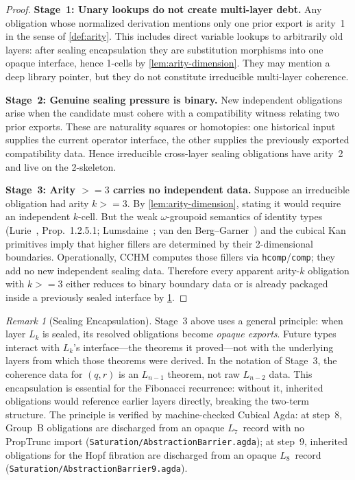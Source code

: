 \documentclass[11pt,a4paper]{article}
\def\geq{>=}%
\theoremstyle{plain}
\theoremstyle{definition}
\theoremstyle{remark}
\newtheorem{remark}[theorem]{Remark}
\begin{document}
\begin{proof}
\textbf{Stage~1: Unary lookups do not create multi-layer debt.}
Any obligation whose normalized derivation mentions only one prior export is arity~1 in the sense of \cref{def:arity}.
This includes direct variable lookups to arbitrarily old layers: after sealing encapsulation they are substitution morphisms into one opaque interface, hence 1-cells by \cref{lem:arity-dimension}.
They may mention a deep library pointer, but they do not constitute irreducible multi-layer coherence.

\medskip\noindent\textbf{Stage~2: Genuine sealing pressure is binary.}
New independent obligations arise when the candidate must cohere with a compatibility witness relating two prior exports.
These are naturality squares or homotopies: one historical input supplies the current operator interface, the other supplies the previously exported compatibility data.
Hence irreducible cross-layer sealing obligations have arity~2 and live on the 2-skeleton.

\medskip\noindent\textbf{Stage~3: Arity $\geq 3$ carries no independent data.}
Suppose an irreducible obligation had arity $k \geq 3$.
By \cref{lem:arity-dimension}, stating it would require an independent $k$-cell.
But the weak $\omega$-groupoid semantics of identity types (Lurie~\cite{lurie}, Prop.~1.2.5.1; Lumsdaine~\cite{lumsdaine}; van den Berg--Garner~\cite{vdberg-garner}) and the cubical Kan primitives imply that higher fillers are determined by their 2-dimensional boundaries.
Operationally, CCHM computes those fillers via \texttt{hcomp}/\texttt{comp}; they add no new independent sealing data.
Therefore every apparent arity-$k$ obligation with $k \geq 3$ either reduces to binary boundary data or is already packaged inside a previously sealed interface by \cref{rem:encapsulation}.
\end{proof}

\begin{remark}[Sealing Encapsulation]
\label{rem:encapsulation}
Stage~3 above uses a general principle: when layer $L_k$ is sealed, its resolved obligations become \emph{opaque exports}.
Future types interact with $L_k$'s interface---the theorems it proved---not with the underlying layers from which those theorems were derived.
In the notation of Stage~3, the coherence data for $(q, r)$ is an $L_{n-1}$ theorem, not raw $L_{n-2}$ data.
This encapsulation is essential for the Fibonacci recurrence: without it, inherited obligations would reference earlier layers directly, breaking the two-term structure.
The principle is verified by machine-checked Cubical Agda: at step~8, Group~B obligations are discharged from an opaque $L_7$~record with no PropTrunc import (\texttt{Saturation/AbstractionBarrier.agda}); at step~9, inherited obligations for the Hopf fibration are discharged from an opaque $L_8$~record (\texttt{Saturation/AbstractionBarrier9.agda}).
\end{remark}
\end{document}
